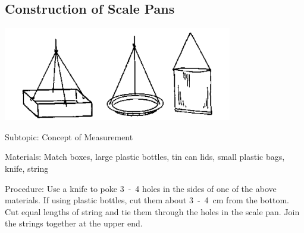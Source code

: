 %
%

\subsection{Construction of Scale Pans}
\label{sub:scalepans}

\begin{center}
\includegraphics[width=10cm]{./img/source/scale-pans.png}
\end{center}

\begin{description*}
\item[Subtopic:]{Concept of Measurement}
\item[Materials:]{Match boxes, large plastic bottles, tin can lids, small plastic bags, knife, string}
\item[Procedure:]{Use a knife to poke 3~-~4 holes in the sides of one of the above materials. If using plastic bottles, cut them about 3~-~4~cm from the bottom. Cut equal lengths of string and tie them through the holes in the scale pan. Join the strings together at the upper end. }
\end{description*}


